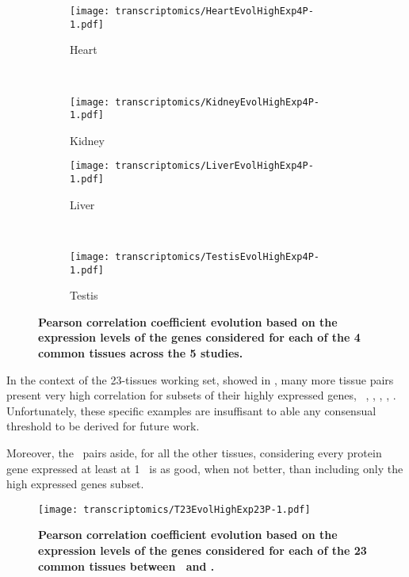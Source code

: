 \begin{sidewaysfigure}[htpb]
    \centering
    \begin{subfigure}[b]{0.50\textwidth}\centering
        \texttt{[image: transcriptomics/HeartEvolHighExp4P-1.pdf]}
        \caption{Heart}\label{fig:CorHighExpHeart4T}
    \end{subfigure}%
~%
    \begin{subfigure}[b]{0.50\textwidth}\centering
        \texttt{[image: transcriptomics/KidneyEvolHighExp4P-1.pdf]}
        \caption{Kidney}\label{fig:CorHighExpKidney4T}
    \end{subfigure}

    \begin{subfigure}[b]{0.50\textwidth}\centering
        \texttt{[image: transcriptomics/LiverEvolHighExp4P-1.pdf]}
        \caption{Liver}\label{fig:CorHighExpLiver4T}
    \end{subfigure}%
~%
    \begin{subfigure}[b]{0.50\textwidth}\centering
        \texttt{[image: transcriptomics/TestisEvolHighExp4P-1.pdf]}
        \caption{Testis}\label{fig:CorHighExpTestis4T}
    \end{subfigure}
    \caption[Pearson correlation coefficient evolution based on the expression
    levels of the genes considered for each of the 4 common tissues]{%
\label{fig:CorHighExp4T}\textbf{Pearson correlation coefficient evolution
    based on the expression levels of the genes considered for each of the 4
    common tissues across the 5 studies.}}
\end{sidewaysfigure}

In the context of the 23-tissues working set,
showed in ,
many more tissue pairs present very high correlation for subsets of their highly
expressed genes, \ie\ \skeletal, \Thyroid, \Cortex, \Uterus, \Kidney.
Unfortunately, these specific examples are insuffisant
to able any consensual threshold to be derived for future work.

Moreover, the \kidney\ pairs aside,
for all the other tissues,
considering every protein gene expressed at least at 1 \FPKM\ is as good, when
not better, than including only the high expressed genes subset.

\begin{figure}[htpb]
    \texttt{[image: transcriptomics/T23EvolHighExp23P-1.pdf]}\centering
    \caption[Pearson correlation coefficient evolution based on the expression
    levels of the genes considered for each of the 23 common tissues]{%
\label{fig:CorHighExp23T}\textbf{Pearson correlation coefficient evolution based
on the expression levels of the genes considered
for each of the 23 common tissues between \uhlen\ and \gtex.}}
\end{figure}

